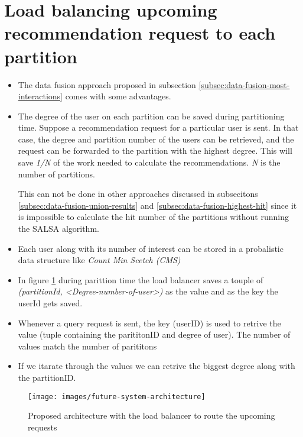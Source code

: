 \section{Load balancing upcoming recommendation request to each partition}
\label{sec:load-balancing}

\begin{itemize}
    \item The data fusion approach proposed in subsection \ref{subsec:data-fusion-most-interactions} comes with some advantages.
    \item The degree of the user on each partition can be saved during partitioning time. Suppose a recommendation request for a particular user is sent. In that case, the degree and partition number of the users can be retrieved, and the request can be forwarded to the partition with the highest degree. This will save \emph{1/N} of the work needed to calculate the recommendations. \emph{N} is the number of partitions. 
    
    This can not be done in other approaches discussed in subsecitons \ref{subsec:data-fusion-union-results} and \ref{subsec:data-fusion-highest-hit} since it is impossible to calculate the hit number of the partitions without running the SALSA algorithm.

    \item Each user along with its number of interest can be stored in a probalistic data structure like \emph{Count Min Scetch (CMS)} \cite{cormode2005improved} 
    \item In figure \ref{fig:loadbalancer} during parittion time the load balancer saves a touple of \emph{(partitionId, <Degree-number-of-user>)} as the value and as the key the userId gets saved. 
    \item Whenever a query request is sent, the key (userID) is used to retrive the value (tuple containing the parititonID and degree of user). The number of values match the number of parititons
    \item If we itarate through the values we can retrive the biggest degree along with the partitionID.
\end{itemize}



\begin{figure}[!h]
	\centering
	\texttt{[image: images/future-system-architecture]}
	\caption{Proposed architecture with the load balancer to route the upcoming requests}
	\label{fig:loadbalancer}
\end{figure}